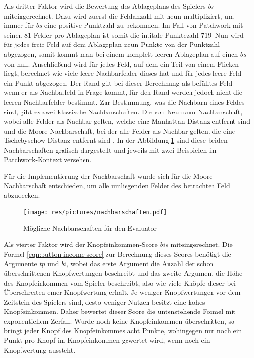 Als dritter Faktor wird die Bewertung des Ablageplans des Spielers $bs$ miteingerechnet. Dazu wird zuerst die Feldanzahl mit neun multipliziert, um immer für $bs$ eine positive Punktzahl zu bekommen. Im Fall von Patchwork mit seinen 81 Felder pro Ablageplan ist somit die intitale Punktezahl 719. Nun wird für jedes freie Feld auf dem Ablageplan neun Punkte von der Punktzahl abgezogen, somit kommt man bei einem komplett leeren Ablageplan auf einen $bs$ von null. Anschließend wird für jedes Feld, auf dem ein Teil von einem Flicken liegt, berechnet wie viele leere Nachbarfelder dieses hat und für jedes leere Feld ein Punkt abgezogen. Der Rand gilt bei dieser Berechnung als befülltes Feld, wenn er als Nachbarfeld in Frage kommt, für den Rand werden jedoch nicht die leeren Nachbarfelder bestimmt. Zur Bestimmung, was die Nachbarn eines Feldes sind, gibt es zwei klassische Nachbarschaften: Die von Neumann Nachbarschaft, wobei alle Felder als Nachbar gelten, welche eine Manhattan-Distanz entfernt sind und die Moore Nachbarschaft, bei der alle Felder als Nachbar gelten, die eine Tschebyschow-Distanz entfernt sind \cite[S. 2]{2016.kneighborhood}. In der Abbildung \ref{fig:nachbarschaften} sind diese beiden Nachbarschaften grafisch dargestellt und jeweils mit zwei Beispielen im Patchwork-Kontext versehen.

Für die Implementierung der Nachbarschaft wurde sich für die Moore Nachbarschaft entschieden, um alle umliegenden Felder des betrachten Feld abzudecken.

\begin{figure}[!ht]
    \centering
    \texttt{[image: res/pictures/nachbarschaften.pdf]}
    \caption{Mögliche Nachbarschaften für den Evaluator}
    \label{fig:nachbarschaften}
\end{figure}

Als vierter Faktor wird der Knopfeinkommen-Score $bis$ miteingerechnet. Die Formel \ref{eqn:button-income-score} zur Berechnung dieses Scores benötigt die Argumente $tp$ und $bi$, wobei das erste Argument die Anzahl der schon überschrittenen Knopfwertungen beschreibt und das zweite Argument die Höhe des Knopfeinkommen vom Spieler beschreibt, also wie viele Knöpfe dieser bei Überschreiten einer Knopfwertung erhält. Je weniger Knopfwertungen vor dem Zeitstein des Spielers sind, desto weniger Nutzen besitzt eine hohes Knopfeinkommen. Daher bewertet dieser Score die untenstehende Formel mit exponentiellem Zerfall. Wurde noch keine Knopfeinkommen überschritten, so bringt jeder Knopf des Knopfeinkommes acht Punkte, wohingegen nur noch ein Punkt pro Knopf im Knopfeinkommen gewertet wird, wenn noch ein Knopfwertung aussteht.

